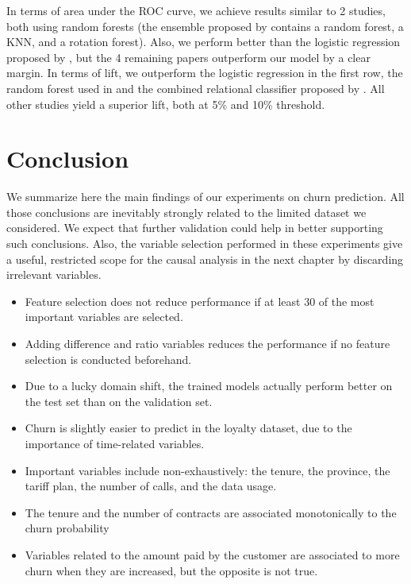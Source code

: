 In terms of area under the ROC curve, we achieve results similar to 2 studies,
both using random forests (the ensemble proposed by \textcite{idris2014ensemble}
contains a random forest, a KNN, and a rotation forest). Also, we perform better
than the logistic regression proposed by \textcite{coussement2017comparative},
but the 4 remaining papers outperform our model by a clear margin. In terms of
lift, we outperform the logistic regression in the first row, the random forest
used in \textcite{mitrovic2018operational} and the combined relational
classifier proposed by \textcite{verbeke2014social}. All other studies yield a
superior lift, both at 5\% and 10\% threshold.

\section{Conclusion}

We summarize here the main findings of our experiments on churn prediction. All
those conclusions are inevitably strongly related to the limited dataset we
considered. We expect that further validation could help in better supporting
such conclusions. Also, the variable selection performed in these experiments
give a useful, restricted scope for the causal analysis in the next chapter by
discarding irrelevant variables.

\begin{itemize}
    \item Feature selection does not reduce performance if at least 30 of the
    most important variables are selected.
    \item Adding difference and ratio variables reduces the performance if no
    feature selection is conducted beforehand.
    \item Due to a lucky domain shift, the trained models actually perform
    better on the test set than on the validation set.
    \item Churn is slightly easier to predict in the loyalty dataset, due to
    the importance of time-related variables.
    \item Important variables include non-exhaustively: the tenure, the
    province, the tariff plan, the number of calls, and the data usage.
    \item The tenure and the number of contracts are associated monotonically to
    the churn probability
    \item Variables related to the amount paid by the customer are associated to
    more churn when they are increased, but the opposite is not true.
\end{itemize}
